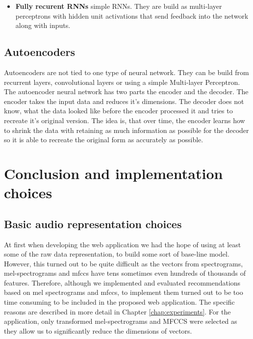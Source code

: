 \begin{itemize}
    \item \textbf{Fully recurent RNNs} simple RNNs. They are build as multi-layer perceptrons with hidden unit activations that send feedback into the network along with inputs.
\end{itemize}

\subsection{Autoencoders}
Autoencoders are not tied to one type of neural network. They can be build from recurrent layers, convolutional layers or using a simple Multi-layer Perceptron. The autoencoder neural network has two parts the encoder and the decoder. The encoder takes the input data and reduces it's dimensions. The decoder does not know, what the data looked like before the encoder processed it and tries to recreate it's original version. The idea is, that over time, the encoder learns how to shrink the data with retaining as much information as possible for the decoder so it is able to recreate the original form as accurately as possible. 

\section{Conclusion and implementation choices}

\subsection{Basic audio representation choices}
At first when developing the web application we had the hope of using at least some of the raw data representation, to build some sort of base-line model. However, this turned out to be quite difficult as the vectors from spectrograms, mel-spectrograms and mfccs have tens sometimes even hundreds of thousands of features. Therefore, although we implemented and evaluated recommendations based on mel spectrograms and mfccs, to implement them turned out to be too time consuming to be included in the proposed web application. The specific reasons are described in more detail in Chapter \ref{chap:experiments}. For the application, only transformed mel-spectrograms and MFCCS were selected as they allow us to significantly reduce the dimensions of vectors.

